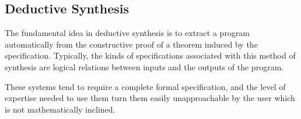 \subsection{Deductive Synthesis}
\label{sec:deductive-synthesis}

The fundamental idea in deductive synthesis is to extract a program
automatically from the constructive proof of a theorem induced by the
specification. Typically, the kinds of specifications associated with this
method of synthesis are logical relations between inputs and the outputs of the
program. 

These systems tend to require a complete formal specification, and the level
of expertise needed to use them turn them easily unapproachable by the user
which is not mathematically inclined.

